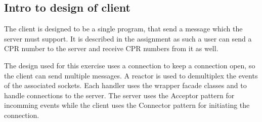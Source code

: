 \documentclass[Main]{subfiles}
\begin{document}
\subsection{Intro to design of client}

The client is designed to be a single program, that send a message which the server must support. 
It is described in the assignment as such a user can send a CPR number to the server and receive CPR numbers from it as well.

The design used for this exercise uses a connection to keep a connection open, so the client can send multiple messages.
A reactor is used to demultiplex the events of the associated sockets. 
Each handler uses the wrapper facade classes  and  to handle connections to the server.
The server uses the Acceptor pattern for incomming events while the client uses the Connector pattern for initiating the connection.
\end{document}
